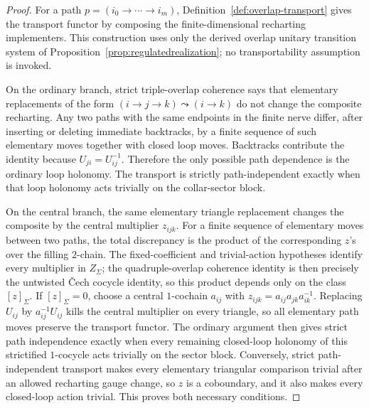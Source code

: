 \documentclass[11pt]{article}
\begin{document}
\begin{proof}
For a path \(p=(i_0\to\cdots\to i_m)\), Definition~\ref{def:overlap-transport} gives the
transport functor by composing the finite-dimensional recharting implementers. This construction
uses only the derived overlap unitary transition system of
Proposition~\ref{prop:regulatedrealization}; no transportability assumption is invoked.

On the ordinary branch, strict triple-overlap coherence says that elementary replacements of the
form \((i\to j\to k)\leadsto(i\to k)\) do not change the composite recharting. Any two paths with
the same endpoints in the finite nerve differ, after inserting or deleting immediate backtracks,
by a finite sequence of such elementary moves together with closed loop moves. Backtracks
contribute the identity because \(U_{ji}=U_{ij}^{-1}\). Therefore the only possible path
dependence is the ordinary loop holonomy. The transport is strictly path-independent exactly when
that loop holonomy acts trivially on the collar-sector block.

On the central branch, the same elementary triangle replacement changes the composite by the
central multiplier \(z_{ijk}\). For a finite sequence of elementary moves between two paths, the
total discrepancy is the product of the corresponding \(z\)'s over the filling \(2\)-chain. The
fixed-coefficient and trivial-action hypotheses identify every multiplier in \(Z_\Sigma\); the
quadruple-overlap coherence identity is then precisely the untwisted \v{C}ech cocycle identity, so this product
depends only on the class \([z]_\Sigma\). If \([z]_\Sigma=0\), choose a central \(1\)-cochain
\(a_{ij}\) with \(z_{ijk}=a_{ij}a_{jk}a_{ik}^{-1}\). Replacing \(U_{ij}\) by \(a_{ij}^{-1}U_{ij}\)
kills the central multiplier on every triangle, so all elementary path moves preserve the
transport functor. The ordinary argument then gives strict path independence exactly when every
remaining closed-loop holonomy of this strictified \(1\)-cocycle acts trivially on the sector
block. Conversely, strict path-independent transport makes every elementary triangular comparison
trivial after an allowed recharting gauge change, so \(z\) is a coboundary, and it also makes every
closed-loop action trivial. This proves both necessary conditions.


\end{proof}
\end{document}

